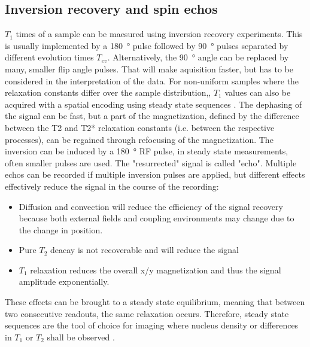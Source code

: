         \subsection{Inversion recovery and spin echos}
            $T_1$ times of a sample can be maesured using inversion recovery experiments. This is usually implemented by a \SI{180}{\degree} pulse followed by \SI{90}{\degree} pulses separated by different evolution times $T_{ev}$. Alternatively, the \SI{90}{\degree} angle can be replaced by many, smaller flip angle pulses. That will make aquisition faster, but has to be considered in the interpretation of the data. For non-uniform samples where the relaxation constants differ over the sample distribution,, $T_1$ values can also be acquired with a spatial encoding using steady state sequences \cite{scheffler_t1_2001}.
            The dephasing of the signal can be fast, but a part of the magnetization, defined by the difference between the T2 and T2* relaxation constants (i.e. between the respective processes), can be regained through refocusing of the magnetization. The inversion can be induced by a \SI{180}{\degree} RF pulse, in steady state measurements, often smaller pulses are used. The "resurrected" signal is called "echo". Multiple echos can be recorded if multiple inversion pulses are applied, but different effects effectively reduce the signal in the course of the recording:
            \begin{itemize}
                \item Diffusion and convection will reduce the efficiency of the signal recovery because both external fields and coupling environments may change due to the change in position.
                \item Pure $T_2$ deacay is not recoverable and will reduce the signal
                \item $T_1$ relaxation reduces the overall x/y magnetization and thus the signal amplitude exponentially.
            \end{itemize}
             These effects can be brought to a steady state equilibrium, meaning that between two consecutive readouts, the same relaxation occurs. Therefore, steady state sequences are the tool of choice for imaging where nucleus density or differences in $T_1$ or $T_2$ shall be observed  \cite{nitz_contrast_1999}.

